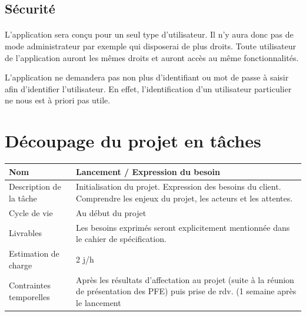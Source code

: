 \documentclass[CDS,UTF8,final]{EPURapport}
\begin{document}
\subsection{Sécurité}
\paragraph{}
L'application sera conçu pour un seul type d'utilisateur. Il n'y aura donc pas de mode administrateur par exemple qui disposerai de plus droits. Toute utilisateur de l'application auront les mêmes droits et auront accès au même fonctionnalités. \par
L'application ne demandera pas non plus d'identifiant ou mot de passe à saisir afin d'identifier l'utilisateur. En effet, l'identification d'un utilisateur particulier ne nous est à priori pas utile. 

\section{Découpage du projet en tâches}

\begin{table}[h!]
\centering
\begin{tabular}{|p{4cm}|p{10cm}|}
\hline
Nom                     & Lancement / Expression du besoin                                                                                                          \\ \hline
Description de la tâche & Initialisation du projet. Expression des besoins du client. Comprendre les enjeux du projet, les acteurs et les attentes.                 \\ \hline
Cycle de vie            & Au début du projet                                                                                                                        \\ \hline
Livrables               & Les besoins exprimés seront explicitement mentionnée dans le cahier de spécification.                                                     \\ \hline
Estimation de charge    & 2 j/h                                                                                                                                     \\ \hline
Contraintes temporelles & Après les résultats d'affectation au projet (suite à la réunion de présentation des PFE) puis prise de rdv. (1 semaine après le lancement \\ \hline
\end{tabular}
\end{table}
\par
\end{document}
